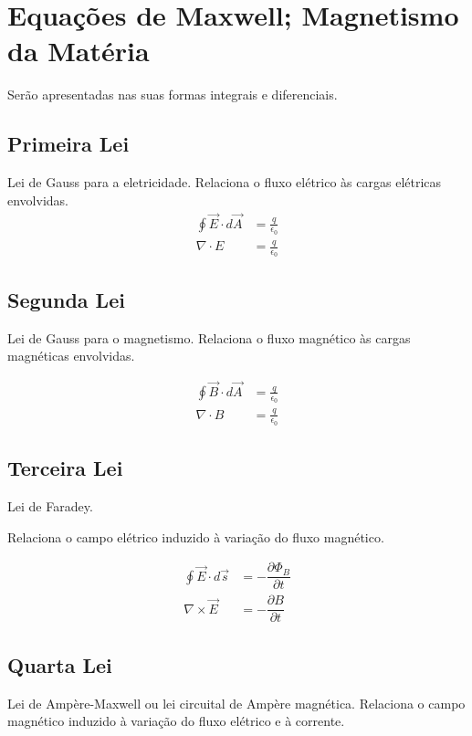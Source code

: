 \section{Equações de Maxwell; Magnetismo da Matéria}

Serão apresentadas nas suas formas integrais e diferenciais.

\subsection{Primeira Lei}

Lei de Gauss para a eletricidade. Relaciona o fluxo elétrico às cargas elétricas envolvidas.
\begin{equation}
\begin{split}
    \oint{\vec{E}\cdot d\vec{A}}&=\frac{q}{\epsilon_0}\\
    \nabla\cdot E&=\frac{q}{\epsilon_0}
\end{split}
\end{equation}

\subsection{Segunda Lei}
Lei de Gauss para o magnetismo. Relaciona o fluxo magnético às cargas magnéticas envolvidas.

\begin{equation}
\begin{split}
    \oint{\vec{B}\cdot d\vec{A}}&=\frac{q}{\epsilon_0}\\
    \nabla\cdot B&=\frac{q}{\epsilon_0}
\end{split}
\end{equation}

\subsection{Terceira Lei}
Lei de Faradey. 

Relaciona o campo elétrico induzido à variação do fluxo magnético.

\begin{equation}
\begin{split}
\oint{\vec{E} \cdot d\vec{s}}&=-\dfrac{\partial \Phi_B}{\partial t}\\
\nabla \times \vec{E}&=-\dfrac{\partial B}{\partial t}
\end{split}   
\end{equation}


\subsection{Quarta Lei}
Lei de Ampère-Maxwell ou lei circuital de Ampère magnética. Relaciona o campo magnético induzido à variação do fluxo elétrico e à corrente.

